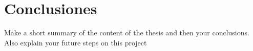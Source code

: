 \chapter{Conclusiones}
\label{chapter:concl}

Make a short summary of the content of the thesis \cite{reyes2018analytical,pena-gomar2006coherent,barrera1991optical,garcia2012multiple} and then your conclusions. Also explain your future steps on this project 

\blindtext

\blindtext
